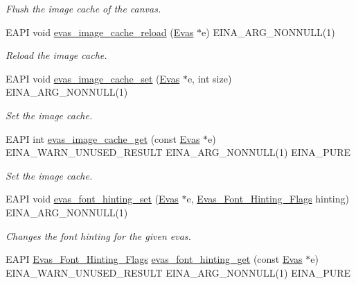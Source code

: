 \begin{DoxyCompactItemize}
\begin{DoxyCompactList}\small\item\em Flush the image cache of the canvas. \item\end{DoxyCompactList}\item 
EAPI void \hyperlink{group__Evas__Image__Group_gaec7f0a6cd5e39ebc6f0a80e945127981}{evas\_\-image\_\-cache\_\-reload} (\hyperlink{group__Evas__Canvas_ga5ff87cc4ce6bc43e3b640a6d37f73043}{Evas} $\ast$e) EINA\_\-ARG\_\-NONNULL(1)
\begin{DoxyCompactList}\small\item\em Reload the image cache. \item\end{DoxyCompactList}\item 
EAPI void \hyperlink{group__Evas__Image__Group_gab28271aad78206e5ee9bed62e0decfa7}{evas\_\-image\_\-cache\_\-set} (\hyperlink{group__Evas__Canvas_ga5ff87cc4ce6bc43e3b640a6d37f73043}{Evas} $\ast$e, int size) EINA\_\-ARG\_\-NONNULL(1)
\begin{DoxyCompactList}\small\item\em Set the image cache. \item\end{DoxyCompactList}\item 
EAPI int \hyperlink{group__Evas__Image__Group_gad7ee7f4627d198c0de0ff197fe2f9ed0}{evas\_\-image\_\-cache\_\-get} (const \hyperlink{group__Evas__Canvas_ga5ff87cc4ce6bc43e3b640a6d37f73043}{Evas} $\ast$e) EINA\_\-WARN\_\-UNUSED\_\-RESULT EINA\_\-ARG\_\-NONNULL(1) EINA\_\-PURE
\begin{DoxyCompactList}\small\item\em Set the image cache. \item\end{DoxyCompactList}\item 
EAPI void \hyperlink{group__Evas__Font__Group_gaf39062952fc420ff32fbacfb8c27bd7d}{evas\_\-font\_\-hinting\_\-set} (\hyperlink{group__Evas__Canvas_ga5ff87cc4ce6bc43e3b640a6d37f73043}{Evas} $\ast$e, \hyperlink{group__Evas__Font__Group_gaaed9273c1705a3d2356470c60b2f5aa5}{Evas\_\-Font\_\-Hinting\_\-Flags} hinting) EINA\_\-ARG\_\-NONNULL(1)
\begin{DoxyCompactList}\small\item\em Changes the font hinting for the given evas. \item\end{DoxyCompactList}\item 
EAPI \hyperlink{group__Evas__Font__Group_gaaed9273c1705a3d2356470c60b2f5aa5}{Evas\_\-Font\_\-Hinting\_\-Flags} \hyperlink{group__Evas__Font__Group_gafe785a87743b72d8064f0562fd79cc75}{evas\_\-font\_\-hinting\_\-get} (const \hyperlink{group__Evas__Canvas_ga5ff87cc4ce6bc43e3b640a6d37f73043}{Evas} $\ast$e) EINA\_\-WARN\_\-UNUSED\_\-RESULT EINA\_\-ARG\_\-NONNULL(1) EINA\_\-PURE

\end{DoxyCompactItemize}
